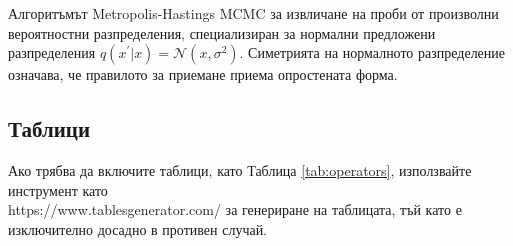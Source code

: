 \begin{algorithm}
    \DontPrintSemicolon
    
\caption{Алгоритъмът Metropolis-Hastings MCMC за извличане на проби от произволни вероятностни разпределения, 
специализиран за нормални предложени разпределения $q(x^\prime|x) = \mathcal{N}(x, \sigma^2)$. Симетрията на нормалното разпределение означава, че правилото за приемане приема опростената форма.}\label{alg:metropolis}
\end{algorithm}

\subsection{Таблици}

Ако трябва да включите таблици, като Таблица \cref{tab:operators}, използвайте инструмент като\\ https://www.tablesgenerator.com/ за генериране на таблицата, тъй като е
изключително досадно в противен случай. 

